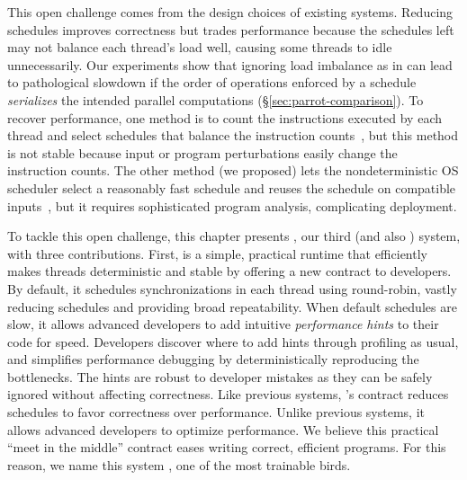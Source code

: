 This open challenge comes from the design choices of existing \smt systems. 
Reducing schedules improves correctness
but trades performance because the schedules left may not balance each
thread's load well, causing some threads to idle unnecessarily.  Our
experiments show that ignoring load imbalance as in \dthreads
can lead to pathological
slowdown if the order of operations enforced by a schedule
\emph{serializes} the intended parallel computations
(\S\ref{sec:parrot-comparison}).  To recover performance, one method is to count
the instructions executed by each thread and select schedules that balance
the instruction counts~\cite{kendo:asplos09, coredet:asplos10,
  dmp:asplos09}, but this method is not stable because input or program
perturbations easily change the instruction counts.  The other method (we
proposed)
lets the nondeterministic OS scheduler select
a reasonably fast schedule and reuses the schedule on
compatible inputs~\cite{cui:tern:osdi10,peregrine:sosp11}, but it
requires sophisticated program analysis, complicating deployment.



To tackle this open challenge, this chapter presents \parrot, our third \smt 
(and also \dmt) system, with three contributions.
First, \parrot is a simple, practical runtime that efficiently makes
threads deterministic and stable by offering a new contract to developers.
By default, it schedules synchronizations in each thread using
round-robin, vastly reducing schedules and providing broad repeatability.
When default schedules are slow, it allows advanced developers to add
intuitive \emph{performance hints} to their code for speed.  Developers discover
where to add hints through profiling as usual, and \parrot simplifies
performance debugging by deterministically reproducing the bottlenecks.
The hints are robust to developer mistakes as they can be safely ignored
without affecting correctness. Like previous systems, \parrot's contract reduces
schedules to favor correctness over performance.  Unlike previous systems, it
allows advanced developers to optimize performance.  We believe this practical 
``meet in the middle'' contract eases writing correct, efficient programs. For 
this reason, we name this system \parrot, one of the most trainable birds.


